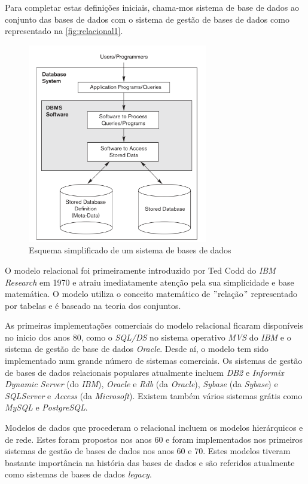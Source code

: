 \documentclass[11pt,twoside,a4paper]{report}
\begin{document}
Para completar estas definições iniciais, chama-mos sistema de base de dados ao conjunto das bases de dados com o sistema de gestão de bases de dados como representado na \autoref{fig:relacional1}.
\begin{figure}[H]
	\begin{center}
		\includegraphics[width=0.7\textwidth]{SGBD} %
		\caption{Esquema simplificado de um sistema de bases de dados}
		\label{fig:relacional1}
	\end{center}
\end{figure}
O modelo relacional foi primeiramente introduzido por Ted Codd do \textit{IBM Research} em 1970\cite{Elmasri:2010:FDS:1855347,Codd} e atraiu imediatamente atenção pela sua simplicidade e base matemática. O modelo utiliza o conceito matemático de $ " $relação$ " $ representado por tabelas e é baseado na teoria dos conjuntos\cite{Elmasri:2010:FDS:1855347}.\par
As primeiras implementações comerciais do modelo relacional ficaram disponíveis no inicio dos anos 80, como o \textit{SQL/DS} no sistema operativo \textit{MVS} do \textit{IBM} e o sistema de gestão de base de dados \textit{Oracle}. Desde aí, o modelo tem sido implementado num grande número de sistemas comerciais. Os sistemas de gestão de bases de dados relacionais populares atualmente incluem \textit{DB2} e \textit{Informix Dynamic Server} (do \textit{IBM}), \textit{Oracle} e \textit{Rdb} (da \textit{Oracle}), \textit{Sybase} (da \textit{Sybase}) e \textit{SQLServer} e \textit{Access} (da \textit{Microsoft}). Existem também vários sistemas grátis como \textit{MySQL} e \textit{PostgreSQL}\cite{Elmasri:2010:FDS:1855347}.\par
Modelos de dados que procederam o relacional incluem os modelos hierárquicos e de rede. Estes foram propostos nos anos 60 e foram implementados nos primeiros sistemas de gestão de bases de dados nos anos 60 e 70. Estes modelos tiveram bastante importância na história das bases de dados e são referidos atualmente como sistemas de bases de dados \textit{legacy}\cite{Elmasri:2010:FDS:1855347}.
\end{document}
